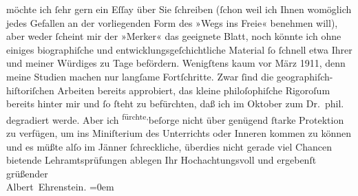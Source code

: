 \begin{ledgroupsized}[t]{13cm}
                    möchte ich ſehr gern ein Eſſay über Sie ſchreiben (ſchon weil ich Ihnen
                    womöglich jedes Gefallen an der vorliegenden Form des »Wegs ins Freie« benehmen will), aber weder ſcheint mir {\pb}der »Merker« das geeignete Blatt, noch könnte ich ohne einiges
                    biographiſche und entwicklungsgeſchichtliche Material ſo ſchnell etwa Ihrer und
                    meiner Würdiges zu Tage befördern. Wenigſtens kaum vor März 1911,
                    denn meine Studien machen nur langſame Fortſchritte. Zwar ſind die
                    geographiſch-hiſtoriſchen Arbeiten bereits approbiert, das kleine philoſophiſche
                    Rigoroſum bereits hinter mir und ſo ſteht zu befürchten, daß ich im
                        Oktober zum Dr. phil. degradiert werde. Aber ich \substVorne{}\textsuperscript{fürchte,}{\allowbreak}\substDazwischen{}beſorge\substHinten{} nicht über genügend ſtarke Protektion zu verfügen, um ins Miniſterium des Unterrichts oder Inneren kommen zu können und es müßte alſo im
                        Jänner{ }ſchreckliche, überdies nicht gerade viel
                    Chancen bietende Lehramtsprüfungen ablegen\pend
           \pstart
           Ihr Hochachtungsvoll und ergebenſt grüßender{\\[\baselineskip]}\spacefill\mbox{Albert Ehrenstein.}\pend
           \leftskip=0em{}\endnumbering{}\end{ledgroupsized}  \newcommand{\dateiname}{L01946}\newcommand{\titel}{Albert Ehrenstein an Arthur Schnitzler, 12. 7. 1910}\newcommand{\editorInnen}{Martin Anton Müller und Gerd-Hermann Susen}
      